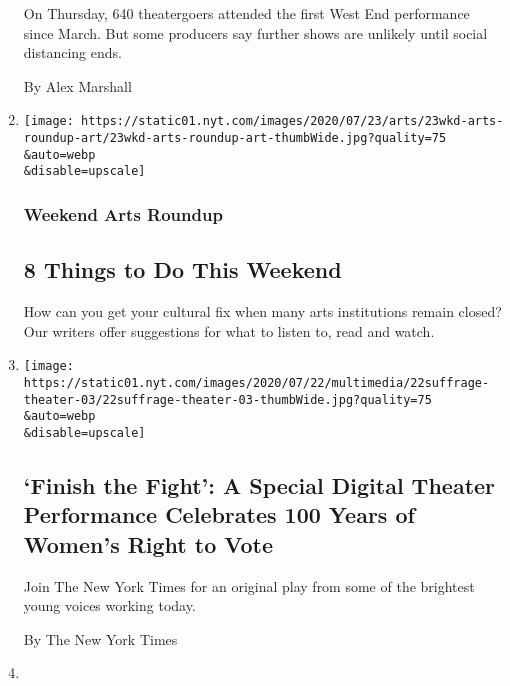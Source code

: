\begin{enumerate}
  On Thursday, 640 theatergoers attended the first West End performance
  since March. But some producers say further shows are unlikely until
  social distancing ends.

  By Alex Marshall
\item
  \href{/2020/07/23/arts/things-to-do-weekend-coronavirus.html}{}

  \texttt{[image: https://static01.nyt.com/images/2020/07/23/arts/23wkd-arts-roundup-art/23wkd-arts-roundup-art-thumbWide.jpg?quality=75\\\&auto=webp\\\&disable=upscale]}

  \hypertarget{weekend-arts-roundup}{%
  \subsubsection{Weekend Arts Roundup}\label{weekend-arts-roundup}}

  \hypertarget{8-things-to-do-this-weekend}{%
  \subsection{8 Things to Do This
  Weekend}\label{8-things-to-do-this-weekend}}

  How can you get your cultural fix when many arts institutions remain
  closed? Our writers offer suggestions for what to listen to, read and
  watch.
\item
  \href{/2020/07/23/theater/finish-the-fight-suffrage-centennial-performance.html}{}

  \texttt{[image: https://static01.nyt.com/images/2020/07/22/multimedia/22suffrage-theater-03/22suffrage-theater-03-thumbWide.jpg?quality=75\\\&auto=webp\\\&disable=upscale]}

  \hypertarget{finish-the-fight-a-special-digital-theater-performance-celebrates-100-years-of-womens-right-to-vote}{%
  \subsection{`Finish the Fight': A Special Digital Theater Performance
  Celebrates 100 Years of Women's Right to
  Vote}\label{finish-the-fight-a-special-digital-theater-performance-celebrates-100-years-of-womens-right-to-vote}}

  Join The New York Times for an original play from some of the
  brightest young voices working today.

  By The New York Times
\item
  \href{/2020/07/23/theater/manual-cinema-puppets-retrospective.html}{}


\end{enumerate}
